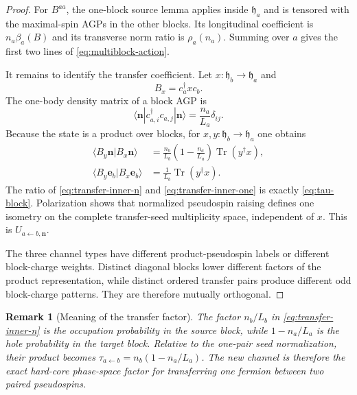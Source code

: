 \documentclass[11pt]{article}
\numberwithin{equation}{section}
\newtheorem{remark}[theorem]{Remark}
\newcommand{\bn}{\mathbf n}
\newcommand{\be}{\mathbf e}
\newcommand{\Tr}{\operatorname{Tr}}
\begin{document}
\begin{proof}
For $B^{aa}$, the one-block source lemma applies inside $\mathfrak h_a$ and is tensored with the maximal-spin AGPs in the other blocks.  Its longitudinal coefficient is $n_a\beta_a(B)$ and its transverse norm ratio is $\rho_a(n_a)$.  Summing over $a$ gives the first two lines of \eqref{eq:multiblock-action}.

It remains to identify the transfer coefficient.  Let $x:\mathfrak h_b\to\mathfrak h_a$ and
\begin{equation}
 B_x=c_a^\dagger x c_b.
 \label{eq:Bx}
\end{equation}
The one-body density matrix of a block AGP is
\begin{equation}
 \langle\bn|c_{a,i}^\dagger c_{a,j}|\bn\rangle
 =\frac{n_a}{L_a}\delta_{ij}.
 \label{eq:block-1rdm}
\end{equation}
Because the state is a product over blocks, for $x,y:\mathfrak h_b\to\mathfrak h_a$ one obtains
\begin{align}
 \langle B_y\bn|B_x\bn\rangle
 &={\frac{n_b}{L_b}}
 \left(1-\frac{n_a}{L_a}\right)
 \Tr(y^\dagger x),
 \label{eq:transfer-inner-n}\\
 \langle B_y\be_b|B_x\be_b\rangle
 &={\frac1{L_b}}\Tr(y^\dagger x).
 \label{eq:transfer-inner-one}
\end{align}
The ratio of \eqref{eq:transfer-inner-n} and \eqref{eq:transfer-inner-one} is exactly \eqref{eq:tau-block}.  Polarization shows that normalized pseudospin raising defines one isometry on the complete transfer-seed multiplicity space, independent of $x$.  This is $U_{a\leftarrow b,\bn}$.

The three channel types have different product-pseudospin labels or different block-charge weights.  Distinct diagonal blocks lower different factors of the product representation, while distinct ordered transfer pairs produce different odd block-charge patterns.  They are therefore mutually orthogonal.
\end{proof}

\begin{remark}[Meaning of the transfer factor]
The factor $n_b/L_b$ in \eqref{eq:transfer-inner-n} is the occupation probability in the source block, while $1-n_a/L_a$ is the hole probability in the target block.  Relative to the one-pair seed normalization, their product becomes $\tau_{a\leftarrow b}=n_b(1-n_a/L_a)$.  The new channel is therefore the exact hard-core phase-space factor for transferring one fermion between two paired pseudospins.
\end{remark}
\end{document}
